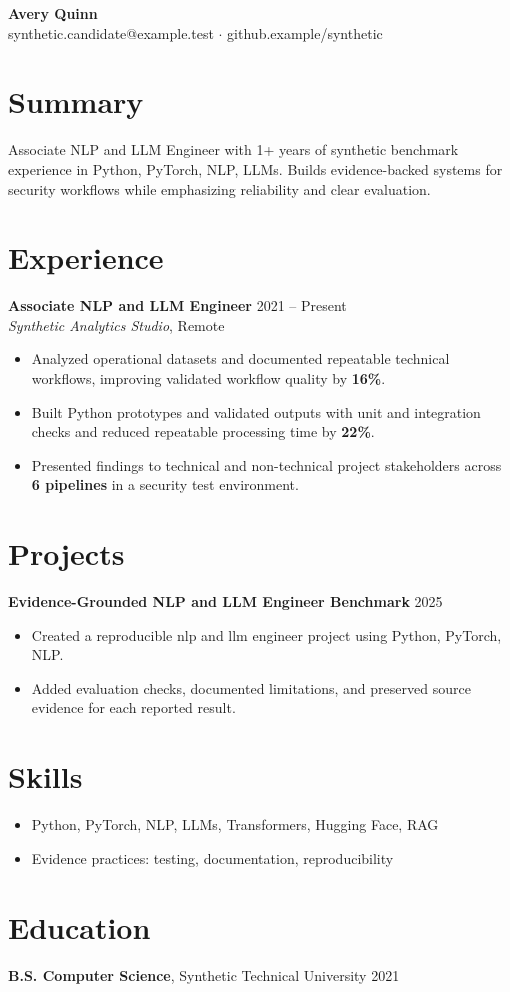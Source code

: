 \documentclass[10pt,letterpaper]{article}
\begin{document}
\begin{center}
{\Large \textbf{Avery Quinn}}\\
synthetic.candidate@example.test $\cdot$ github.example/synthetic
\end{center}

\section*{Summary}
Associate NLP and LLM Engineer with 1+ years of synthetic benchmark experience in Python, PyTorch, NLP, LLMs. Builds evidence-backed systems for security workflows while emphasizing reliability and clear evaluation.

\section*{Experience}
\textbf{Associate NLP and LLM Engineer} \hfill 2021 -- Present\\
\textit{Synthetic Analytics Studio}, Remote
\begin{itemize}
  \item Analyzed operational datasets and documented repeatable technical workflows, improving validated workflow quality by \textbf{16\%}.
  \item Built Python prototypes and validated outputs with unit and integration checks and reduced repeatable processing time by \textbf{22\%}.
  \item Presented findings to technical and non-technical project stakeholders across \textbf{6 pipelines} in a security test environment.
\end{itemize}

\section*{Projects}
\textbf{Evidence-Grounded NLP and LLM Engineer Benchmark} \hfill 2025
\begin{itemize}
  \item Created a reproducible nlp and llm engineer project using Python, PyTorch, NLP.
  \item Added evaluation checks, documented limitations, and preserved source evidence for each reported result.
\end{itemize}

\section*{Skills}
\begin{itemize}
  \item Python, PyTorch, NLP, LLMs, Transformers, Hugging Face, RAG
  \item Evidence practices: testing, documentation, reproducibility
\end{itemize}

\section*{Education}
\textbf{B.S. Computer Science}, Synthetic Technical University \hfill 2021
\end{document}
